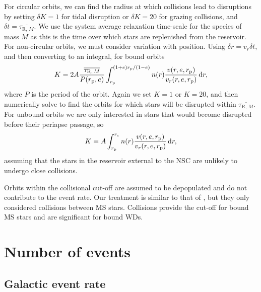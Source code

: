 For circular orbits, we can find the radius at which collisions lead to disruptions by setting $\delta K = 1$ for tidal disruption or $\delta K = 20$ for grazing collisions, and $\delta t = \overline{\tau_{\mathrm{R},\,M}}$. We use the system average relaxation time-scale for the species of mass $M$ as this is the time over which stars are replenished from the reservoir. For non-circular orbits, we must consider variation with position. Using $\delta r = v_r \delta t$, and then converting to an integral, for bound orbits
\begin{equation}
K = 2 A \dfrac{\overline{\tau_{\mathrm{R},\,M}}}{P(r_\mathrm{p},e)}\int_{r_\mathrm{p}}^{(1+e)r_\mathrm{p}/(1-e)}{n(r)\dfrac{v(r,e,r_\mathrm{p})}{v_r(r,e,r_\mathrm{p})}}\,\mathrm{d}{r},
\label{eq:collision-K}
\end{equation}
where $P$ is the period of the orbit. Again we set $K = 1$ or $K = 20$, and then numerically solve  to find the orbits for which stars will be disrupted within $\overline{\tau_{\mathrm{R},\,M}}$. For unbound orbits we are only interested in stars that would become disrupted before their periapse passage, so
\begin{equation}
K = A \int_{r_\mathrm{p}}^{r_\mathrm{c}}{n(r)\dfrac{v(r,e,r_\mathrm{p})}{v_r(r,e,r_\mathrm{p})}}\,\mathrm{d}{r},
\end{equation}
assuming that the stars in the reservoir external to the NSC are unlikely to undergo close collisions.

Orbits within the collisional cut-off are assumed to be depopulated and do not contribute to the event rate. Our treatment is similar to that of \citet{Hopman2007}, but they only considered collisions between MS stars. Collisions provide the cut-off for bound MS stars and are significant for bound WDs.

\section{Number of events}\label{sec:no-events}

\subsection{Galactic event rate}

